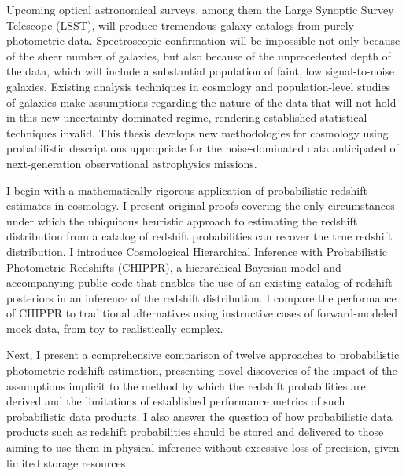 Upcoming optical astronomical surveys, among them the Large Synoptic Survey Telescope (\textsc{LSST}), will produce tremendous galaxy catalogs from purely photometric data.
Spectroscopic confirmation will be impossible not only because of the sheer number of galaxies, but also because of the unprecedented depth of the data, which will include a substantial population of faint, low signal-to-noise galaxies.
Existing analysis techniques in cosmology and population-level studies of galaxies make assumptions regarding the nature of the data that will not hold in this new uncertainty-dominated regime, rendering established statistical techniques invalid.
This thesis develops new methodologies for cosmology using probabilistic descriptions appropriate for the noise-dominated data anticipated of next-generation observational astrophysics missions. 

I begin with a mathematically rigorous application of probabilistic redshift estimates in cosmology.
I present original proofs covering the only circumstances under which the ubiquitous heuristic approach to estimating the redshift distribution from a catalog of redshift probabilities can recover the true redshift distribution.
I introduce Cosmological Hierarchical Inference with Probabilistic Photometric Redshifts (CHIPPR), a hierarchical Bayesian model and accompanying public code that enables the use of an existing catalog of redshift posteriors in an inference of the redshift distribution.
I compare the performance of CHIPPR to traditional alternatives using instructive cases of forward-modeled mock data, from toy to realistically complex.

Next, I present a comprehensive comparison of twelve approaches to probabilistic photometric redshift estimation, presenting novel discoveries of the impact of the assumptions implicit to the method by which the redshift probabilities are derived and the limitations of established performance metrics of such probabilistic data products.
I also answer the question of how probabilistic data products such as redshift probabilities should be stored and delivered to those aiming to use them in physical inference without excessive loss of precision, given limited storage resources.

